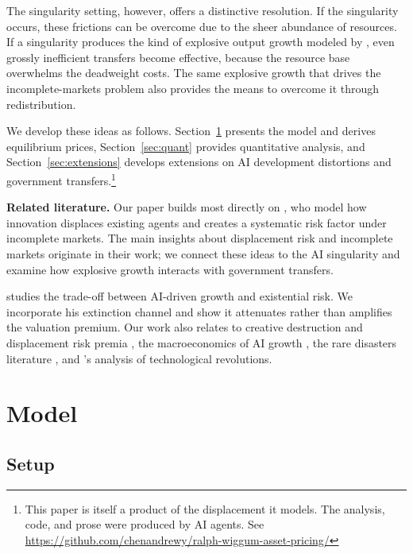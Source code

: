 \documentclass[12pt]{article}
\begin{document}
The singularity setting, however, offers a distinctive resolution. If the singularity occurs, these frictions can be overcome due to the sheer abundance of resources. If a singularity produces the kind of explosive output growth modeled by \citet{Jones2024}, even grossly inefficient transfers become effective, because the resource base overwhelms the deadweight costs. The same explosive growth that drives the incomplete-markets problem also provides the means to overcome it through redistribution.

We develop these ideas as follows. Section~\ref{sec:model} presents the model and derives equilibrium prices, Section~\ref{sec:quant} provides quantitative analysis, and Section~\ref{sec:extensions} develops extensions on AI development distortions and government transfers.\footnote{This paper is itself a product of the displacement it models. The analysis, code, and prose were produced by AI agents. See \url{https://github.com/chenandrewy/ralph-wiggum-asset-pricing/}}

\medskip
\noindent\textbf{Related literature.}
Our paper builds most directly on \citet{GKP2012}, who model how innovation displaces existing agents and creates a systematic risk factor under incomplete markets. The main insights about displacement risk and incomplete markets originate in their work; we connect these ideas to the AI singularity and examine how explosive growth interacts with government transfers.

\citet{Jones2024} studies the trade-off between AI-driven growth and existential risk. We incorporate his extinction channel and show it attenuates rather than amplifies the valuation premium. Our work also relates to creative destruction and displacement risk premia \citep{KoganPapanikolaou2014,KoganPapanikolaouStoffman2020,Knesl2023}, the macroeconomics of AI growth \citep{AghionJonesJones2019,Acemoglu2025}, the rare disasters literature \citep{Barro2006,Wachter2013}, and \citet{PastorVeronesi2009}'s analysis of technological revolutions.

\section{Model} \label{sec:model} %

\subsection{Setup} %
\end{document}
